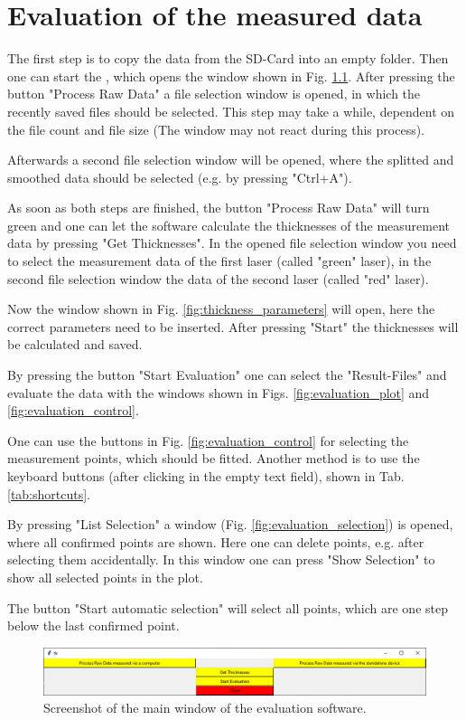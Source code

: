 \chapter{Evaluation of the measured data}

The first step is to copy the data from the SD-Card into an empty folder. 
Then one can start the , which opens the window shown in Fig. \ref{fig:mainWindow_Evaluation}. After pressing the button "Process Raw Data" a file selection window is opened, in which the recently saved files should be selected. This step may take a while, dependent on the file count and file size (The window may not react during this process). 

Afterwards a second file selection window will be opened, where the splitted and smoothed data should be selected (e.g. by pressing "Ctrl+A"). 


As soon as both steps are finished, the button "Process Raw Data" will turn green and one can let the software calculate the thicknesses of the measurement data by pressing "Get Thicknesses". 
In the opened file selection window you need to select the measurement data of the first laser (called "green" laser), in the second file selection window the data of the second laser (called "red" laser). 


Now the window shown in Fig. \ref{fig:thickness_parameters} will open, here the correct parameters need to be inserted. After pressing "Start" the thicknesses will be calculated and saved. 

By pressing the button "Start Evaluation" one can select the "Result-Files" and evaluate the data with the windows shown in Figs. \ref{fig:evaluation_plot} and \ref{fig:evaluation_control}.

One can use the buttons in Fig. \ref{fig:evaluation_control} for selecting the measurement points, which should be fitted. Another method is to use the keyboard buttons (after clicking in the empty text field), shown in Tab. \ref{tab:shortcuts}. 

By pressing "List Selection" a window (Fig. \ref{fig:evaluation_selection}) is opened, where all confirmed points are shown. Here one can delete points, e.g. after selecting them accidentally. 
In this window one can press "Show Selection" to show all selected points in the plot.

The button "Start automatic selection" will select all points, which are one step below the last confirmed point. 


\begin{figure}
	\centering
	\includegraphics[width=0.7\linewidth]{LamellaDevice_Evaluation/Software}
	\caption{Screenshot of the main window of the evaluation software.}
	\label{fig:mainWindow_Evaluation}
\end{figure}

